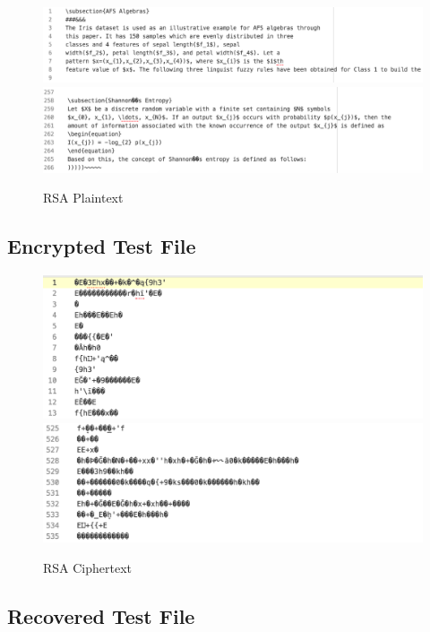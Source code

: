 \documentclass[]{article}
\begin{document}
\begin{figure}[H]
	\includegraphics[height=\textheight/6,width=\textwidth]{rsa_plain1.png}
	\includegraphics[height=\textheight/6,width=\textwidth]{rsa_plain2.png}	
	\caption{RSA Plaintext}
	\centering
\end{figure}

\subsection*{Encrypted Test File}

\begin{figure}[H]
	\includegraphics[width=\textwidth]{rsa_cipher1.png}
	\includegraphics[width=\textwidth]{rsa_cipher2.png}	
	\caption{RSA Ciphertext}
	\centering
\end{figure}

\subsection*{Recovered Test File}
\end{document}
